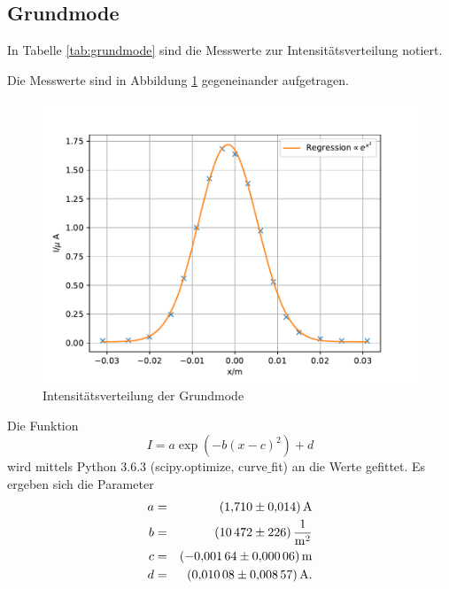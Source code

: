 \subsection{Grundmode}
In Tabelle \ref{tab:grundmode} sind die Messwerte zur Intensitätsverteilung notiert.

Die Messwerte sind in Abbildung \ref{fig:grundmode} gegeneinander aufgetragen.
\begin{figure}
  \centering
  \includegraphics[width=\textwidth]{grundmode.pdf}
  \caption{Intensitätsverteilung der Grundmode}
  \label{fig:grundmode}
\end{figure}
Die Funktion
\begin{equation*}
  I= a \exp{\left( -b(x-c)^2 \right)}+d
\end{equation*}
wird mittels Python 3.6.3 (scipy.optimize, curve$\_$fit) an die Werte gefittet.
Es ergeben sich die Parameter
\begin{align*}
a &=& \SI{  1.710 \pm 0.014 }{A}\\
b &=& \SI{  10472 \pm 226 }{\frac{1}{m^2}}\\
c &=& \SI{ -0.00164 \pm 0.00006 }{m}\\
d &=& \SI{  0.01008 \pm 0.00857 }{A}.\\
\end{align*}
%
